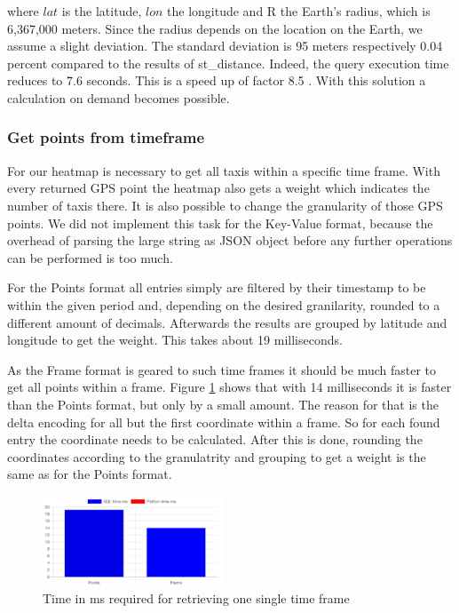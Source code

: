 \documentclass[10pt]{sig-alternate}
\begin{document}
where $lat$ is the latitude, $lon$ the longitude and R the Earth's radius, which is 6,367,000 meters. Since the radius depends on the location on the Earth, we assume a slight deviation. The standard deviation is 95 meters respectively 0.04 percent compared to the results of st\_distance. Indeed, the query execution time reduces to 7.6 seconds. This is a speed up of factor 8.5 . With this solution a calculation on demand becomes possible.

\subsubsection{Get points from timeframe}
For our heatmap is necessary to get all taxis within a specific time frame. With every returned GPS point the heatmap also gets a weight which indicates the number of taxis there. It is also possible to change the granularity of those GPS points. We did not implement this task for the Key-Value format, because the overhead of parsing the large string as JSON object before any further operations can be performed is too much.

For the Points format all entries simply are filtered by their timestamp to be within the given period and, depending on the desired granilarity, rounded to a different amount of decimals. Afterwards the results are grouped by latitude and longitude to get the weight. This takes about 19 milliseconds.

As the Frame format is geared to such time frames it should be much faster to get all points within a frame. Figure \ref{fig:bench_whole_trajectory} shows that with 14 milliseconds it is faster than the Points format, but only by a small amount. The reason for that is the delta encoding for all but the first coordinate within a frame. So for each found entry the coordinate needs to be calculated. After this is done, rounding the coordinates according to the granulatrity and grouping to get a weight is the same as for the Points format.
\begin{figure}[ht]
  \centering
  \includegraphics[width=0.48\textwidth]{img/bench_single_frame.png}
  \caption{Time in ms required for retrieving one single time frame}
  \label{fig:bench_whole_trajectory}
\end{figure}
\end{document}
